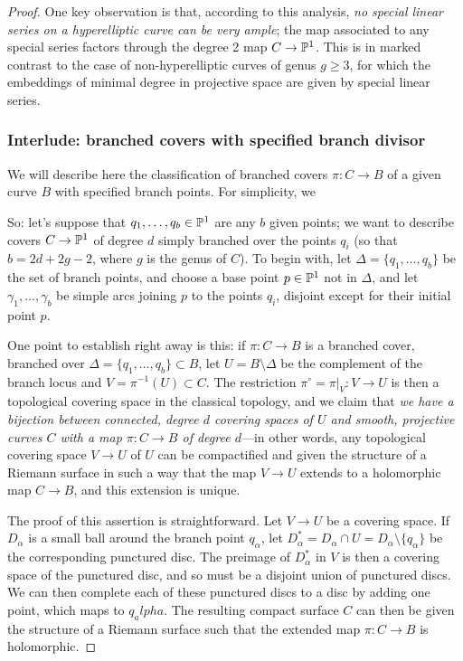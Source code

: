 \begin{proof}
One key observation is that, according to this analysis, \emph{no special linear series on a hyperelliptic curve can be very ample}; the map associated to any special series factors through the degree 2 map $C \to \PP^1$. This is in marked contrast to the case of non-hyperelliptic curves of genus $g \geq 3$, for which the embeddings of minimal degree in projective space are given by special linear series. 

   \subsubsection{Interlude: branched covers with specified branch divisor}\label{branched covers}
   
   We will describe here the classification of branched covers $\pi : C \to B$ of a given curve $B$ with specified branch points. For simplicity, we
   
   So: let's suppose that $q_1, \dots ,q_b \in \PP^1$ are any $b$ given points; we want to describe covers $C \to \PP^1$ of degree $d$ simply branched over the points $q_i$ (so that $b = 2d + 2g - 2$, where $g$ is the genus of $C$). To begin with, let $\Delta = \{q_1,\dots,q_b\}$ be the set of branch points, and choose a base point $p \in \PP^1$ not in $\Delta$, and let $\gamma_1, \dots, \gamma_b$ be simple arcs joining $p$ to the points $q_i$, disjoint except for their initial point $p$.
   
   One point to establish right away is this: if $\pi : C \to B$ is a branched cover, branched over $\Delta = \{q_1,\dots,q_b\} \subset B$, let $U = B \setminus \Delta$ be the complement of the branch locus and $V = \pi^{-1}(U) \subset C$. The restriction $\pi^\circ = \pi |_{V} : V \to U$ is then a topological covering space in the classical topology, and we claim that \emph{we have a bijection between connected, degree $d$ covering spaces of $U$ and smooth, projective curves $C$ with a map $\pi : C \to B$ of degree $d$}---in other words, any topological covering space $V \to U$ of $U$ can be compactified and given the structure of a Riemann surface in such a way that the map $V \to U$ extends to a holomorphic map $C \to B$, and this extension is unique.
   
   The proof of this assertion is straightforward. Let $V \to U$ be a covering space. If $D_\alpha$ is a small ball around the branch point $q_\alpha$, let $D^*_\alpha = D_\alpha \cap U = D_\alpha \setminus \{q_\alpha\}$ be the corresponding punctured disc. The preimage of $D^*_\alpha$ in $V$ is then a covering space of the punctured disc, and so must be a disjoint union of punctured discs. We can then complete each of these punctured discs to a disc by adding one point, which maps to $q_alpha$. The resulting compact surface $C$ can then be given the structure of a Riemann surface such that the extended map $\pi : C \to B$ is holomorphic.
   

\end{proof}

